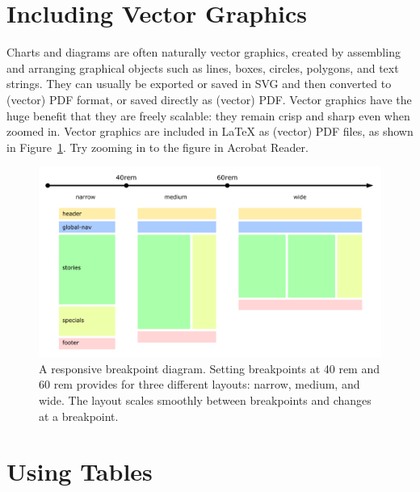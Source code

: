 \section{Including Vector Graphics}

Charts and diagrams are often naturally vector graphics, created by
assembling and arranging graphical objects such as lines, boxes,
circles, polygons, and text strings. They can usually be exported or
saved in SVG and then converted to (vector) PDF format, or saved
directly as (vector) PDF. Vector graphics have the huge benefit that
they are freely scalable: they remain crisp and sharp even when zoomed
in.
%
Vector graphics are included in LaTeX as (vector) PDF files, as shown
in Figure~\ref{fig:BreakpointDiagram}. Try zooming in to the figure in
Acrobat Reader.



\begin{figure}[tp]
\centering
\includegraphics[frame,keepaspectratio,width=\linewidth,height=\halfh]
{diagrams/breakpoint.pdf}

\caption[Responsive Breakpoint Diagram]
{
A responsive breakpoint diagram. Setting breakpoints at 40 rem and 60 rem
provides for three different layouts: narrow, medium, and wide.
The layout scales smoothly between breakpoints and changes at a breakpoint.
}
\label{fig:BreakpointDiagram}
\end{figure}










\section{Using Tables}

